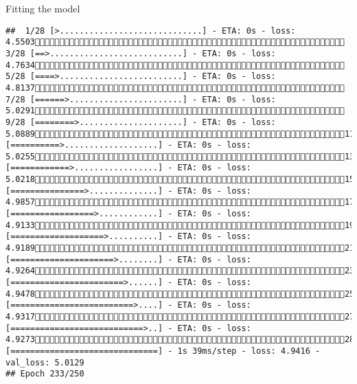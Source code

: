 \documentclass[
  ignorenonframetext,
]{beamer}
\begin{document}
\begin{frame}[fragile]{Fitting the model}
\begin{verbatim}
##  1/28 [>.............................] - ETA: 0s - loss: 4.5503 3/28 [==>...........................] - ETA: 0s - loss: 4.7634 5/28 [====>.........................] - ETA: 0s - loss: 4.8137 7/28 [======>.......................] - ETA: 0s - loss: 5.0291 9/28 [========>.....................] - ETA: 0s - loss: 5.088911/28 [==========>...................] - ETA: 0s - loss: 5.025513/28 [============>.................] - ETA: 0s - loss: 5.021815/28 [===============>..............] - ETA: 0s - loss: 4.985717/28 [=================>............] - ETA: 0s - loss: 4.913319/28 [===================>..........] - ETA: 0s - loss: 4.918921/28 [=====================>........] - ETA: 0s - loss: 4.926423/28 [=======================>......] - ETA: 0s - loss: 4.947825/28 [=========================>....] - ETA: 0s - loss: 4.931727/28 [===========================>..] - ETA: 0s - loss: 4.927328/28 [==============================] - 1s 39ms/step - loss: 4.9416 - val_loss: 5.0129
## Epoch 233/250

\end{verbatim}
\end{frame}
\end{document}
